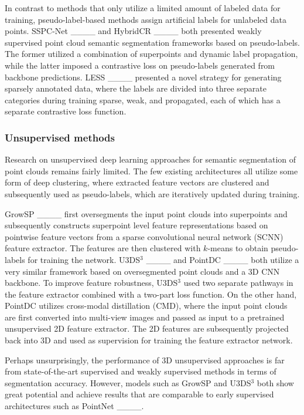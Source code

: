 In contrast to methods that only utilize a limited amount of labeled data for training, pseudo-label-based methods assign artificial labels for unlabeled data points. SSPC-Net ____ and HybridCR ____ both presented weakly supervised point cloud semantic segmentation frameworks based on pseudo-labels. The former utilized a combination of superpoints and dynamic label propagation, while the latter imposed a contrastive loss on pseudo-labels generated from backbone predictions. LESS ____ presented a novel strategy for generating sparsely annotated data, where the labels are divided into three separate categories during training sparse, weak, and propagated, each of which has a separate contrastive loss function.

\subsubsection{Unsupervised methods}

Research on unsupervised deep learning approaches for semantic segmentation of point clouds remains fairly limited. The few existing architectures all utilize some form of deep clustering, where extracted feature vectors are clustered and subsequently used as pseudo-labels, which are iteratively updated during training.

GrowSP ____ first oversegments the input point clouds into superpoints and subsequently constructs superpoint level feature representations based on pointwise feature vectors from a sparse convolutional neural network (SCNN) feature extractor. The features are then clustered with $k$-means to obtain pseudo-labels for training the network. U3DS$^{3}$ ____ and PointDC ____ both utilize a very similar framework based on oversegmented point clouds and a 3D CNN backbone. To improve feature robustness, U3DS$^{3}$ used two separate pathways in the feature extractor combined with a two-part loss function. On the other hand, PointDC utilizes cross-modal distillation (CMD), where the input point clouds are first converted into multi-view images and passed as input to a pretrained unsupervised 2D feature extractor. The 2D features are subsequently projected back into 3D and used as supervision for training the feature extractor network.

Perhaps unsurprisingly, the performance of 3D unsupervised approaches is far from state-of-the-art supervised and weakly supervised methods in terms of segmentation accuracy. However, models such as GrowSP and U3DS$^{3}$ both show great potential and achieve results that are comparable to early supervised architectures such as PointNet ____.

